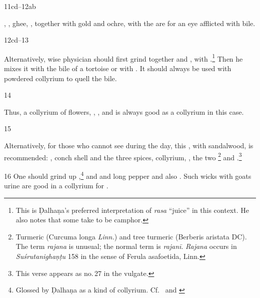 \begin{translation}
    \item[11cd--12ab]
    
    , , ghee, ,
    together with gold and ochre, with the  are for an
    eye afflicted with bile.
    
    \item [12cd--13] 
    
    Alternatively, wise physician should first grind together 
    and ,  with .\footnote{This is Ḍalhaṇa's preferred interpretation
    of \emph{rasa} “juice” in this context.  He also notes that some take
     to be camphor.}  Then he mixes it with the bile of a
    tortoise or with .  It should always be used
    with powdered collyrium to quell the bile.
    
    \item[14]
    
    Thus, a collyrium of  flowers, ,
    ,  and 
    is always good as a collyrium in this case.
    
    
    \item [15]
    
    Alternatively, for those who cannot see during the day, this ,
    with sandalwood, is recommended: , conch shell and the three
    spices, collyrium, , the two
    \footnote{Turmeric (Curcuma longa \textit{Linn.}) and tree
    turmeric (Berberis aristata DC).  The term \emph{rajana} is unusual; the normal
    term is \emph{rajanī}. \emph{Rajana} occurs in \emph{Suśrutanighaṇṭu} 158 in the
    sense of Ferula asafoetida, Linn.} and .\footnote{This verse appears as no.\,27 in the vulgate.}
    
    \item [16] One should grind up ,\footnote{Glossed by Ḍalhaṇa as
    a kind of collyrium.  Cf.\ \cite[2.M13]{nadk-1954} and \cite[197--198]{shar-1982}}
    and  and long pepper and also .  
    Such wicks with goats urine are good in a collyrium for
    .
    

\end{translation}

